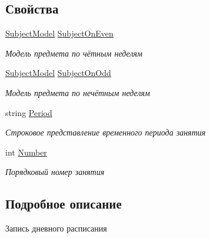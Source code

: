 \subsection*{Свойства}
\begin{DoxyCompactItemize}
\item 
\hyperlink{class_s_f_u_timetable_parser_1_1_core_1_1_entities_1_1_subject_model}{Subject\+Model} \hyperlink{class_s_f_u_timetable_parser_1_1_core_1_1_entities_1_1_timetable_record_a453625dea6c24ea69d5113ce9f60d994}{Subject\+On\+Even}
\begin{DoxyCompactList}\small\item\em Модель предмета по чётным неделям \end{DoxyCompactList}\item 
\hyperlink{class_s_f_u_timetable_parser_1_1_core_1_1_entities_1_1_subject_model}{Subject\+Model} \hyperlink{class_s_f_u_timetable_parser_1_1_core_1_1_entities_1_1_timetable_record_a599e9b6010ce9af0447fa32c42948fb9}{Subject\+On\+Odd}
\begin{DoxyCompactList}\small\item\em Модель предмета по нечётным неделям \end{DoxyCompactList}\item 
string \hyperlink{class_s_f_u_timetable_parser_1_1_core_1_1_entities_1_1_timetable_record_aabd478fcff6c39b11dd7ec6a17379db0}{Period}
\begin{DoxyCompactList}\small\item\em Строковое представление временного периода занятия \end{DoxyCompactList}\item 
int \hyperlink{class_s_f_u_timetable_parser_1_1_core_1_1_entities_1_1_timetable_record_a38e3cb5b0430d92d1a677abda0bf035d}{Number}
\begin{DoxyCompactList}\small\item\em Порядковый номер занятия \end{DoxyCompactList}\end{DoxyCompactItemize}


\subsection{Подробное описание}
Запись дневного расписания 

